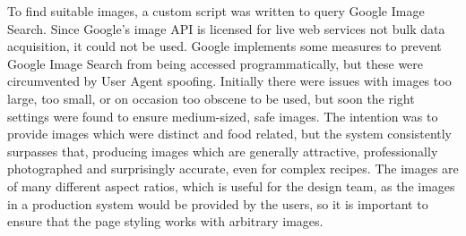 To find suitable images, a custom script was written to query Google Image Search. Since Google's image API is licensed for live web services not bulk data acquisition, it could not be used. Google implements some measures to prevent Google Image Search from being accessed programmatically, but these were circumvented by User Agent spoofing. Initially there were issues with images too large, too small, or on occasion too obscene to be used, but soon the right settings were found to ensure medium-sized, safe images. The intention was to provide images which were distinct and food related, but the system consistently surpasses that, producing images which are generally attractive, professionally photographed and surprisingly accurate, even for complex recipes. The images are of many different aspect ratios, which is useful for the design team, as the images in a production system would be provided by the users, so it is important to ensure that the page styling works with arbitrary images.











